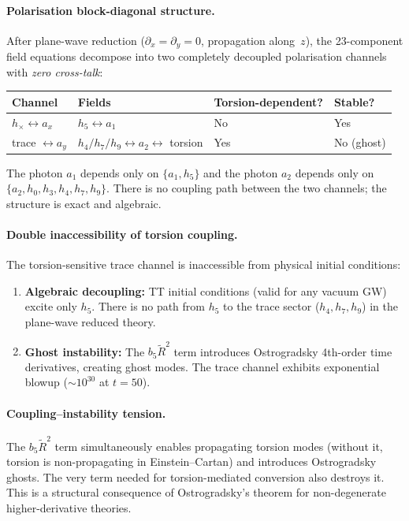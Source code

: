 \paragraph{Polarisation block-diagonal structure.}
After plane-wave reduction ($\partial_x = \partial_y = 0$, propagation along~$z$),
the 23-component field equations decompose into two completely decoupled
polarisation channels with \emph{zero cross-talk}:
\begin{center}
\begin{tabular}{@{}llll@{}}
\toprule
Channel & Fields & Torsion-dependent? & Stable? \\
\midrule
$h_\times \leftrightarrow a_x$ & $h_5 \leftrightarrow a_1$ & No & Yes \\
trace $\leftrightarrow a_y$ & $h_4/h_7/h_9 \leftrightarrow a_2 \leftrightarrow$ torsion & Yes & No (ghost) \\
\bottomrule
\end{tabular}
\end{center}
The photon $a_1$ depends only on $\{a_1, h_5\}$ and the photon $a_2$ depends
only on $\{a_2, h_0, h_3, h_4, h_7, h_9\}$.  There is no coupling path between
the two channels; the structure is exact and algebraic.

\paragraph{Double inaccessibility of torsion coupling.}
The torsion-sensitive trace channel is inaccessible from physical initial conditions:
\begin{enumerate}
  \item \textbf{Algebraic decoupling:} TT initial conditions (valid for any vacuum
    GW) excite only $h_5$.  There is no path from $h_5$ to the trace sector
    ($h_4, h_7, h_9$) in the plane-wave reduced theory.
  \item \textbf{Ghost instability:} The $b_5\widetilde{R}^2$ term introduces
    Ostrogradsky 4th-order time derivatives, creating ghost modes.  The trace
    channel exhibits exponential blowup ($\sim 10^{30}$ at $t{=}50$).
\end{enumerate}

\paragraph{Coupling--instability tension.}
The $b_5\widetilde{R}^2$ term simultaneously enables propagating torsion modes
(without it, torsion is non-propagating in Einstein--Cartan) and introduces
Ostrogradsky ghosts.  The very term needed for torsion-mediated conversion also
destroys it.  This is a structural consequence of Ostrogradsky's theorem for
non-degenerate higher-derivative theories.

